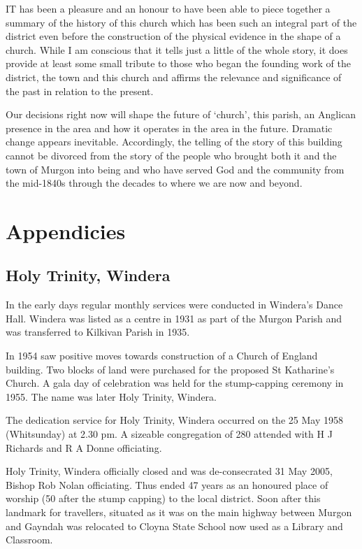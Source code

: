 \lettrine[lines=3]{I}{T}
 has been a pleasure and an honour to have been able to piece together a summary of the history of this church which has been such an integral part of the district even before the construction of the physical evidence in the shape of a church. While I am conscious that it tells just a little of the whole story, it does provide at least some small tribute to those who began the founding work of the district, the town and this church and affirms the relevance and significance of the past in relation to the present.

Our decisions right now will shape the future of `church', this parish, an Anglican presence in the area and how it operates in the area in the future. Dramatic change appears inevitable. Accordingly, the telling of the story of this building cannot be divorced from the story of the people who brought both it and the town of Murgon into being and who have served God and the community from the mid-1840s through the decades to where we are now and beyond.

\balance


\backmatter
\chapter{Appendicies}
\nobalance


\section{Holy Trinity, Windera}



In the early days regular monthly services were conducted in Windera's Dance Hall. Windera was listed as a centre in 1931 as part of the Murgon Parish and was transferred to Kilkivan Parish in 1935.



In 1954 saw positive moves towards construction of a Church of England building. Two blocks of land were purchased for the proposed St Katharine's Church. A gala day of celebration was held for the stump-capping ceremony in 1955. The name was later Holy Trinity, Windera.



The dedication service for Holy Trinity, Windera occurred on the 25 May 1958 (Whitsunday) at 2.30 pm. A sizeable congregation of 280 attended with H J Richards and R A Donne officiating.



Holy Trinity, Windera officially closed and was de-consecrated 31 May 2005, Bishop Rob Nolan officiating. Thus ended 47 years as an honoured place of worship (50 after the stump capping) to the local district. Soon after this landmark for travellers, situated as it was on the main highway between Murgon and Gayndah was relocated to Cloyna State School now used as a Library and Classroom.



